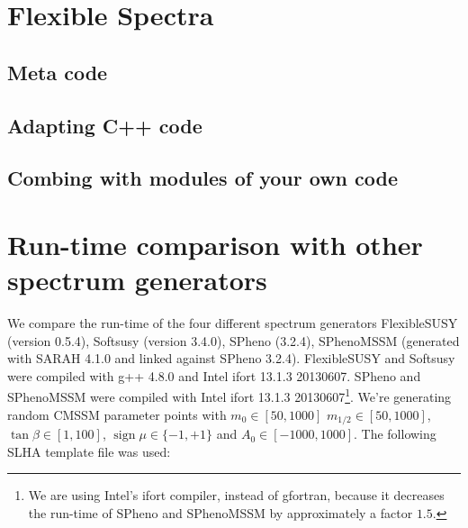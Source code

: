 \documentclass[final,3p,times,pdflatex]{elsarticle}
\DeclareMathOperator{\sign}{sign}
\begin{document}
\section{Flexible Spectra}
\label{Sec:Flexible}
\subsection{Meta code}
\subsection{Adapting C++ code}
\subsection{Combing with  modules of your own code}

\section{Run-time comparison with other spectrum generators}
\label{Sec:comparison}
We compare the run-time of the four different spectrum generators
FlexibleSUSY (version 0.5.4), Softsusy (version 3.4.0), SPheno
(3.2.4), SPhenoMSSM (generated with SARAH 4.1.0 and linked against
SPheno 3.2.4).  FlexibleSUSY and Softsusy were compiled with g++ 4.8.0
and Intel ifort 13.1.3 20130607.  SPheno and SPhenoMSSM were compiled
with Intel ifort 13.1.3 20130607\footnote{We are using Intel's ifort
  compiler, instead of gfortran, because it decreases the run-time of
  SPheno and SPhenoMSSM by approximately a factor $1.5$.}.  We're
generating random CMSSM parameter points with $m_0\in [50,1000]$
$m_{1/2}\in [50,1000]$, $\tan\beta\in [1,100]$, $\sign\mu\in
\{-1,+1\}$ and $A_0\in [-1000,1000]$.  The following SLHA template
file was used:
%
\end{document}
